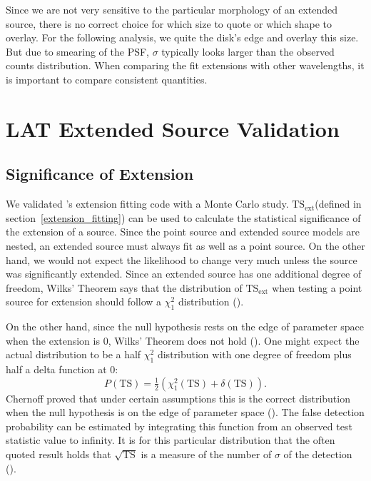 \documentclass[12pt,preprint]{aastex}
\newcommand{\tsext}{{\ensuremath{\text{TS}_\text{ext}}}\xspace}
\newcommand{\ts}{\text{TS}\xspace}
\newcommand{\pointlike}{\text{\em pointlike}\xspace}
\begin{document}
Since we are not very sensitive to the particular morphology of an
extended source, there is no correct choice for which size to quote
or which shape to overlay. For the following analysis, we quite the
disk's edge and overlay this size.  But due to smearing of the PSF,
$\sigma$ typically looks larger than the observed counts distribution.
When comparing the fit extensions with other wavelengths, it is important
to compare consistent quantities.


\section{LAT Extended Source Validation}


\subsection{Significance of Extension}
\label{monte_carlo_validation}

We validated \pointlike's extension fitting code with a Monte Carlo
study. \tsext (defined in section~\ref{extension_fitting}) can be used to calculate the statistical significance
of the extension of a source.  Since the point source and extended source models are
nested, an extended source must always fit as well as a point source.  On the other hand, we would
not expect the likelihood to change very much unless the source was
significantly extended.  Since an extended source has one additional
degree of freedom, Wilks' Theorem says that the distribution of $\tsext$
when testing a point source for extension should follow a $\chi^2_1$
distribution (\cite{wilks_theorem}).

On the other hand, since the null hypothesis rests on the edge of
parameter space when the extension is 0, Wilks' Theorem does not hold
(\cite{warn_wilks_theorem}).  One might expect the actual distribution
to be a half $\chi^2_1$ distribution with one degree of freedom plus
half a delta function at 0:
\begin{equation}
  P(\ts)=\tfrac{1}{2}(\chi^2_1(\ts)+\delta(\ts)).
\end{equation}
Chernoff proved that under certain assumptions this is the correct distribution
when the null hypothesis is on the edge of parameter
space (\cite{chernoff}).  The false detection
probability can be estimated by integrating this function from an observed
test statistic value to infinity. It is for this particular distribution
that the often quoted result holds that $\sqrt{\ts}$ is a measure of
the number of $\sigma$ of the detection (\cite{mattox_egret}).
\end{document}
